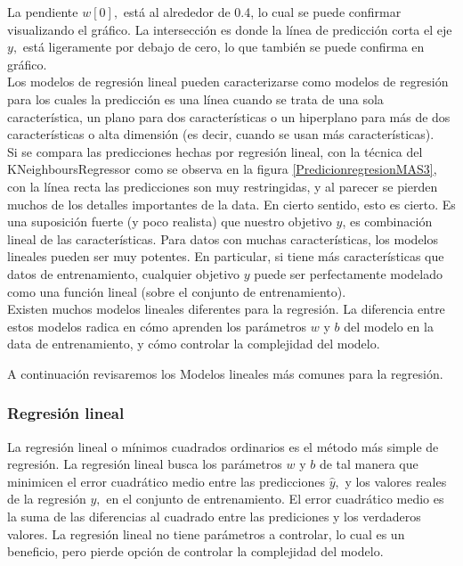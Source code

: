 {La pendiente  $ w[0],$ está al alrededor de 0.4, lo cual se puede confirmar 
visualizando el gráfico. La intersección es donde la línea de predicción corta el eje $y,$
está ligeramente por debajo de cero, lo que también se puede confirma en gráfico.\\

Los modelos de regresión lineal pueden caracterizarse como modelos de regresión para los cuales
la predicción es una línea cuando se trata de una sola característica, un plano  para dos características o un hiperplano para más de dos características  o alta dimensión (es decir, cuando se usan más características).\\

Si se compara las predicciones hechas por regresión lineal, con la técnica del  {\ttfamily KNeighboursRegressor} como se observa en  la figura \ref{PredicionregresionMAS3}, con la línea recta las predicciones son muy restringidas, y al parecer se pierden muchos de los detalles importantes de la data.  En cierto sentido, esto es cierto. Es una suposición fuerte (y poco  realista) que nuestro objetivo $y$,   es combinación lineal  de las características.  Para  datos con muchas características, los modelos lineales pueden ser muy potentes. En particular, si tiene más características que  datos de entrenamiento, cualquier objetivo $y$ puede ser perfectamente modelado como una función lineal (sobre el conjunto de entrenamiento). \\




Existen muchos modelos lineales diferentes para la regresión. La diferencia entre estos modelos radica en cómo  aprenden los parámetros $ w$  y  $b $   del modelo  en la data de entrenamiento, y cómo controlar la complejidad del modelo.

A continuación   revisaremos los  Modelos lineales más comunes  para la regresión.



 

\subsubsection{Regresión lineal}

La regresión lineal o mínimos cuadrados ordinarios es el método más simple de regresión. La regresión lineal busca los parámetros $w$ y $b$ de tal manera que minimicen el error cuadrático medio  entre las predicciones $\hat{y},$  y los valores reales de la  regresión  $y,$ en el conjunto de entrenamiento. El error cuadrático medio es la suma de las diferencias al cuadrado entre las prediciones y los verdaderos valores. La regresión lineal no tiene parámetros a controlar, lo cual es un beneficio, pero pierde opción  de controlar la complejidad del modelo.\\

}

